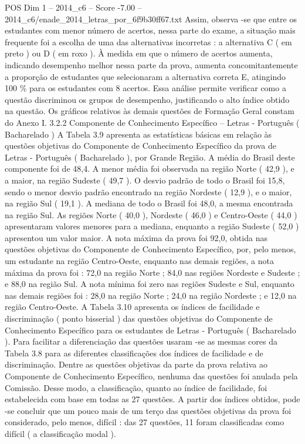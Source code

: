 \begin{textsample}{POS Dim 1 – 2014\_c6 – Score -7.00 – 2014\_c6/enade\_2014\_letras\_por\_6f9b30ff67.txt}
Assim, observa -se que entre os estudantes com menor número de acertos, nessa parte do exame, a situação mais frequente foi a escolha de uma das alternativas incorretas : a alternativa C ( em preto ) ou D ( em roxo ).
À medida em que o número de acertos aumenta, indicando desempenho melhor nessa parte da prova, aumenta concomitantemente a proporção de estudantes que selecionaram a alternativa correta E, atingindo 100 \% para os estudantes com 8 acertos.
Essa análise permite verificar como a questão discriminou os grupos de desempenho, justificando o alto índice obtido na questão.
Os gráficos relativos às demais questões de Formação Geral constam do Anexo I. 3.2.2 Componente de Conhecimento Específico – Letras - Português ( Bacharelado ) A Tabela 3.9 apresenta as estatísticas básicas em relação às questões objetivas do Componente de Conhecimento Específico da prova de Letras - Português ( Bacharelado ), por Grande Região.
A média do Brasil deste componente foi de 48,4.
A menor média foi observada na região Norte ( 42,9 ), e a maior, na região Sudeste ( 49,7 ).
O desvio padrão de todo o Brasil foi 15,8, sendo o menor desvio padrão encontrado na região Nordeste ( 12,9 ), e o maior, na região Sul ( 19,1 ).
A mediana de todo o Brasil foi 48,0, a mesma encontrada na região Sul.
As regiões Norte ( 40,0 ), Nordeste ( 46,0 ) e Centro-Oeste ( 44,0 ) apresentaram valores menores para a mediana, enquanto a região Sudeste ( 52,0 ) apresentou um valor maior.
A nota máxima da prova foi 92,0, obtida nas questões objetivas do Componente de Conhecimento Específico, por, pelo menos, um estudante na região Centro-Oeste, enquanto nas demais regiões, a nota máxima da prova foi : 72,0 na região Norte ; 84,0 nas regiões Nordeste e Sudeste ; e 88,0 na região Sul.
A nota mínima foi zero nas regiões Sudeste e Sul, enquanto nas demais regiões foi : 28,0 na região Norte ; 24,0 na região Nordeste ; e 12,0 na região Centro-Oeste.
A Tabela 3.10 apresenta os índices de facilidade e discriminação ( ponto bisserial ) das questões objetivas do Componente de Conhecimento Específico para os estudantes de Letras - Português ( Bacharelado ).
Para facilitar a diferenciação das questões usaram -se as mesmas cores da Tabela 3.8 para as diferentes classificações dos índices de facilidade e de discriminação.
Dentre as questões objetivas da parte da prova relativa ao Componente de Conhecimento Específico, nenhuma das questões foi anulada pela Comissão.
Desse modo, a classificação, quanto ao índice de facilidade, foi estabelecida com base em todas as 27 questões.
A partir dos índices obtidos, pode -se concluir que um pouco mais de um terço das questões objetivas da prova foi considerado, pelo menos, difícil : das 27 questões, 11 foram classificadas como difícil ( a classificação modal ).

\end{textsample}
